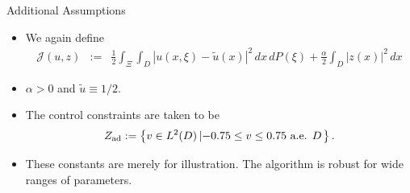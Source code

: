 \documentclass[aspectratio=169,xcolor=dvipsnames,10pt]{beamer}
\newcommand{\E}{\mathbb{E}}
\begin{document}
\begin{frame}{Additional Assumptions}
    \begin{exampleblock}{}
        \begin{itemize}
            \item We again define
\begin{eqnarray}\nonumber
{\mathcal{J}}(u,z)&:=&\frac{1}{2}\int_{\Xi}\int_{D} 
|u(x,\xi) - \widetilde{u}(x)|^2\,dx\,dP(\xi) 
+ \frac{\alpha}{2} \int_{D} |z(x)|^2 \,dx%
\label{object}
\end{eqnarray}
            \item $\alpha > 0$ and $\tilde{u} \equiv 1/2$. 
            \item The control constraints are taken to be
\[
Z_{\rm ad} := \left\{ v \in L^2(D) \left| -0.75 \le v \le 0.75 \text{ a.e. } D \right.\right\}.
\]
            \item These constants are merely for illustration. The algorithm is robust for wide ranges of parameters.
        \end{itemize}
    \end{exampleblock}
\end{frame}
\end{document}
